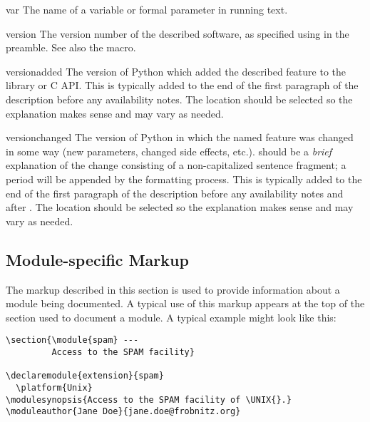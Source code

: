 \documentclass{howto}
\begin{document}
    \begin{macrodesc}{var}{}
      The name of a variable or formal parameter in running text.
    \end{macrodesc}

    \begin{macrodesc}{version}{}
      The version number of the described software, as specified using
       in the preamble.  See also the
       macro.
    \end{macrodesc}

    \begin{macrodesc}{versionadded}{}
      The version of Python which added the described feature to the
      library or C API.  This is typically added to the end of the
      first paragraph of the description before any availability
      notes.  The location should be selected so the explanation makes
      sense and may vary as needed.
    \end{macrodesc}

    \begin{macrodesc}{versionchanged}{}
      The version of Python in which the named feature was changed in
      some way (new parameters, changed side effects, etc.).
       should be a \emph{brief} explanation of the
      change consisting of a non-capitalized sentence fragment; a
      period will be appended by the formatting process.
      This is typically added to the end of the first paragraph of the
      description before any availability notes and after
      .  The location should be selected so the
      explanation makes sense and may vary as needed.
    \end{macrodesc}


  \subsection{Module-specific Markup}

  The markup described in this section is used to provide information
  about a module being documented.  A typical use of this markup
  appears at the top of the section used to document a module.  A
  typical example might look like this:

\begin{verbatim}
\section{\module{spam} ---
         Access to the SPAM facility}

\declaremodule{extension}{spam}
  \platform{Unix}
\modulesynopsis{Access to the SPAM facility of \UNIX{}.}
\moduleauthor{Jane Doe}{jane.doe@frobnitz.org}
\end{verbatim}
\end{document}
